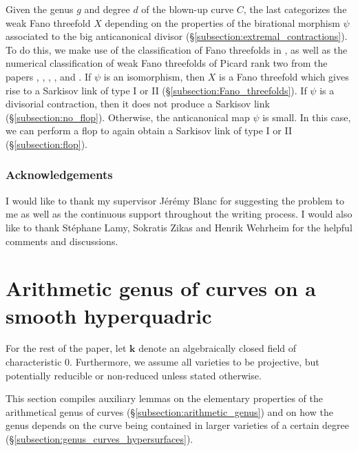 \documentclass[english,11pt,reqno]{amsart}
\newcommand{\kk}{\mathbf{k}}
\begin{document}
	Given the genus $g$ and degree $d$ of the blown-up curve $C$, the last  categorizes the weak Fano threefold $X$ depending on the properties of the birational morphism $\psi$ associated to the big anticanonical divisor (\S\ref{subsection:extremal_contractions}). To do this, we make use of the classification of Fano threefolds in \cite{Mori_Mukai-Fano_threefolds_Picard_rank_2}, as well as the numerical classification of weak Fano threefolds of Picard rank two from the papers \cite{Weak_Fano_threefolds_I-Jahnke_Peternell_Radloff}, \cite{Weak_Fano_threefolds_II-Jahnke_Peternell_Radloff}, \cite{Takeuchi-Weak_Fano_threefolds_del_Pezzo_fibration}, \cite{Cutrone_Marshburn_Classification}, \cite{Arap_Cutrone_Marshburn_weak_Fano_threefolds_Existence} and \cite{Cutrone_Marshburn_Update}. If $\psi$ is an isomorphism, then $X$ is a Fano threefold which gives rise to a Sarkisov link of type I or II (\S\ref{subsection:Fano_threefolds}). If $\psi$ is a divisorial contraction, then it does not produce a Sarkisov link (\S\ref{subsection:no_flop}). Otherwise, the anticanonical map $\psi$ is small. In this case, we can perform a flop to again obtain a Sarkisov link of type I or II (\S\ref{subsection:flop}).
	
	\subsubsection*{Acknowledgements} 
	I would like to thank my supervisor Jérémy Blanc for suggesting the problem to me as well as the continuous support throughout the writing process. I would also like to thank Stéphane Lamy, Sokratis Zikas and Henrik Wehrheim for the helpful comments and discussions. 
	\section{Arithmetic genus of curves on a smooth hyperquadric} \label{section:arithmetic_genus}
	For the rest of the paper, let $\kk$ denote an algebraically closed field of characteristic 0. Furthermore, we assume all varieties to be projective, but potentially reducible or non-reduced unless stated otherwise. \par 
	This section compiles auxiliary lemmas on the elementary properties of the arithmetical genus of curves (\S\ref{subsection:arithmetic_genus}) and on how the genus depends on the curve being contained in larger varieties of a certain degree (\S\ref{subsection:genus_curves_hypersurfaces}). 
\end{document}
